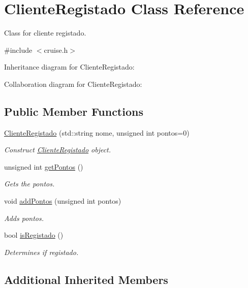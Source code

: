 \hypertarget{classClienteRegistado}{}\section{Cliente\+Registado Class Reference}
\label{classClienteRegistado}


Class for cliente registado.  




{\ttfamily \#include $<$cruise.\+h$>$}



Inheritance diagram for Cliente\+Registado\+:


Collaboration diagram for Cliente\+Registado\+:
\subsection*{Public Member Functions}
\begin{DoxyCompactItemize}
\item 
\hyperlink{classClienteRegistado_a27df6b812a22aa40e43968b4cfc7eec6}{Cliente\+Registado} (std\+::string nome, unsigned int pontos=0)
\begin{DoxyCompactList}\small\item\em Construct \hyperlink{classClienteRegistado}{Cliente\+Registado} object. \end{DoxyCompactList}\item 
unsigned int \hyperlink{classClienteRegistado_a0118e31f16e4dce542f5e1d124d26c61}{get\+Pontos} ()
\begin{DoxyCompactList}\small\item\em Gets the pontos. \end{DoxyCompactList}\item 
void \hyperlink{classClienteRegistado_a0148a97dd713addd6a932f282e076ba3}{add\+Pontos} (unsigned int pontos)
\begin{DoxyCompactList}\small\item\em Adds pontos. \end{DoxyCompactList}\item 
bool \hyperlink{classClienteRegistado_a3dade20423acb0e84c9fbe30c75f0e3e}{is\+Registado} ()
\begin{DoxyCompactList}\small\item\em Determines if registado. \end{DoxyCompactList}\end{DoxyCompactItemize}
\subsection*{Additional Inherited Members}


